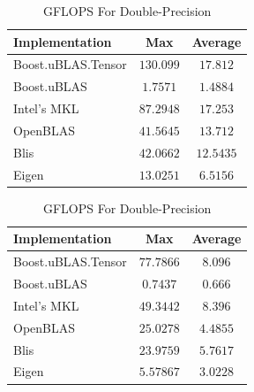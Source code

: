 \begin{table}[ht]
    \centering
    \caption{GFLOPS For Single-Precision}
    \begin{tabular}{|l|c|c|}
        \hline
        \textbf{Implementation} & \textbf{Max} & \textbf{Average}\\
        \hline
        Boost.uBLAS.Tensor  & $130.099$& $17.812$ \\
        \hline
        Boost.uBLAS         & $1.7571$& $1.4884$ \\
        \hline
        Intel's MKL         & $87.2948$& $17.253$ \\
        \hline
        OpenBLAS            & $41.5645$& $13.712$ \\
        \hline
        Blis                & $42.0662$& $12.5435$ \\
        \hline
        Eigen               & $13.0251$& $6.5156$ \\
        \hline
    \end{tabular}

    \vspace*{1 cm}

    \centering
    \caption{GFLOPS For Double-Precision}
    \begin{tabular}{|l|c|c|}
        \hline
        \textbf{Implementation} & \textbf{Max} & \textbf{Average}\\
        \hline
        Boost.uBLAS.Tensor  & $77.7866$& $8.096$ \\
        \hline
        Boost.uBLAS         & $0.7437$& $0.666$ \\
        \hline
        Intel's MKL         & $49.3442$& $8.396$ \\
        \hline
        OpenBLAS            & $25.0278$& $4.4855$ \\
        \hline
        Blis                & $23.9759$& $5.7617$ \\
        \hline
        Eigen               & $5.57867$& $3.0228$ \\
        \hline
    \end{tabular}
\end{table}

